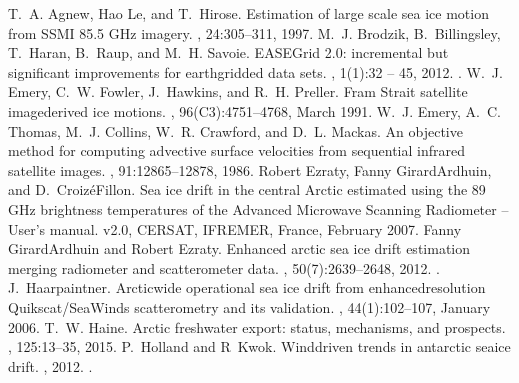 \documentclass[letterpaper,10pt,english]{jupyterBook}
\begin{document}
\begin{sphinxthebibliography}{10}
\sphinxAtStartPar
T. A. Agnew, Hao Le, and T. Hirose. Estimation of large scale sea ice motion from SSMI 85.5 GHz imagery. , 24:305–311, 1997.
\sphinxAtStartPar
M. J. Brodzik, B. Billingsley, T. Haran, B. Raup, and M. H. Savoie. EASE\sphinxhyphen{}Grid 2.0: incremental but significant improvements for earth\sphinxhyphen{}gridded data sets. , 1(1):32 – 45, 2012. .
\sphinxAtStartPar
W. J. Emery, C. W. Fowler, J. Hawkins, and R. H. Preller. Fram Strait satellite image\sphinxhyphen{}derived ice motions. , 96(C3):4751–4768, March 1991.
\sphinxAtStartPar
W. J. Emery, A. C. Thomas, M. J. Collins, W. R. Crawford, and D. L. Mackas. An objective method for computing advective surface velocities from sequential infrared satellite images. , 91:12865–12878, 1986.
\sphinxAtStartPar
Robert Ezraty, Fanny Girard\sphinxhyphen{}Ardhuin, and D. Croizé\sphinxhyphen{}Fillon. Sea ice drift in the central Arctic estimated using the 89 GHz brightness temperatures of the Advanced Microwave Scanning Radiometer – User's manual. v2.0, CERSAT, IFREMER, France, February 2007.
\sphinxAtStartPar
Fanny Girard\sphinxhyphen{}Ardhuin and Robert Ezraty. Enhanced arctic sea ice drift estimation merging radiometer and scatterometer data. , 50(7):2639–2648, 2012. .
\sphinxAtStartPar
J. Haarpaintner. Arctic\sphinxhyphen{}wide operational sea ice drift from enhanced\sphinxhyphen{}resolution Quikscat/SeaWinds scatterometry and its validation. , 44(1):102–107, January 2006.
\sphinxAtStartPar
T. W. Haine. Arctic freshwater export: status, mechanisms, and prospects. , 125:13–35, 2015.
\sphinxAtStartPar
P. Holland and R Kwok. Wind\sphinxhyphen{}driven trends in antarctic sea\sphinxhyphen{}ice drift. , 2012. .

\end{sphinxthebibliography}
\end{document}
